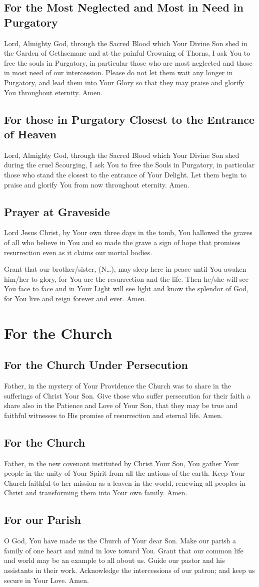 \documentclass[12pt]{article}
\newcommand{\prayersection}[1]{\section{#1}}
\newcommand{\prayertitle}[1]{\subsection{#1}}
\newcommand{\insertname}{(N\dots)\xspace}
\begin{document}
\prayertitle{For the Most Neglected and Most in Need in Purgatory}
\label{prayer:most_neglected_purgatory}
Lord, Almighty God, through the Sacred Blood which Your Divine Son shed in the Garden of Gethsemane and at the painful Crowning of Thorns, I ask You to free the souls in Purgatory, in particular those who are most neglected and those in most need of our intercession.
Please do not let them wait any longer in Purgatory, and lead them into Your Glory so that they may praise and glorify You throughout eternity.
Amen.

\prayertitle{For those in Purgatory Closest to the Entrance of Heaven}
\label{prayer:purgatory_closest_heaven}
Lord, Almighty God, through the Sacred Blood which Your Divine Son shed during the cruel Scourging, I ask You to free the Souls in Purgatory, in particular those who stand the closest to the entrance of Your Delight.
Let them begin to praise and glorify You from now throughout eternity.
Amen.

\prayertitle{Prayer at Graveside}
\label{prayer:graveside}
Lord Jesus Christ, by Your own three days in the tomb, You hallowed the graves of all who believe in You and so made the grave a sign of hope that promises resurrection even as it claims our mortal bodies.

Grant that our brother/sister, \insertname, may sleep here in peace until You awaken him/her to glory, for You are the resurrection and the life.
Then he/she will see You face to face and in Your Light will see light and know the splendor of God, for You live and reign forever and ever.
Amen.

\newpage

\prayersection{For the Church}
\prayertitle{For the Church Under Persecution}
Father, in the mystery of Your Providence the Church was to share in the sufferings of Christ Your Son.
Give those who suffer persecution for their faith a share also in the Patience and Love of Your Son, that they may be true and faithful witnesses to His promise of resurrection and eternal life.
Amen.

\prayertitle{For the Church}
Father, in the new covenant instituted by Christ Your Son, You gather Your people in the unity of Your Spirit from all the nations of the earth.
Keep Your Church faithful to her mission as a leaven in the world, renewing all peoples in Christ and transforming them into Your own family.
Amen.

\prayertitle{For our Parish}
O God, You have made us the Church of Your dear Son.
Make our parish a family of one heart and mind in love toward You.
Grant that our common life and world may be an example to all about us.
Guide our pastor and his assistants in their work.
Acknowledge the intercessions of our patron; and keep us secure in Your Love.
Amen.
\end{document}
